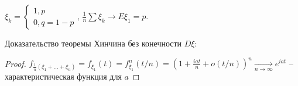 \begin{theorem}[Бернулли]
$\xi_k = \begin{cases} 1, p \\ 0, q = 1 - p \end{cases}$, $\frac 1n\sum \xi_k \to E\xi_1 = p$.
\end{theorem}

Доказательство теоремы Хинчина без конечности $D\xi$:
\begin{proof}
    $f_{\frac1n(\xi_1 + \dots + \xi_n)} = f_{\xi_1}(t) = f_{\xi_1}^n(t/n) = (1 + \frac{iat}{n} + o(t/n))^n \xrightarrow[n \to \infty]{} e^{iat}$ -- характеристическая функция для $a$
\end{proof}                                                                                                                                                                           

